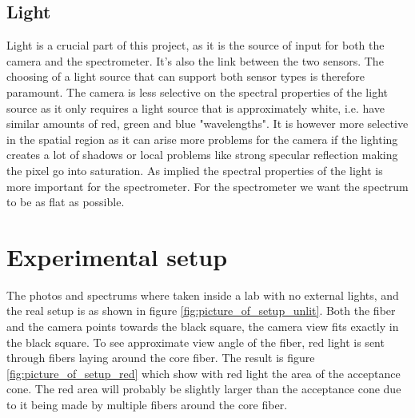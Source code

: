 \subsection{Light}
Light is a crucial part of this project, as it is the source of input for both the camera and the spectrometer. It's also the link between the two sensors. The choosing of a light source that can support both sensor types is therefore paramount. The camera is less selective on the spectral properties of the light source as it only requires a light source that is approximately white, i.e. have similar amounts of red, green and blue "wavelengths". It is however more selective in the spatial region as it can arise more problems for the camera if the lighting creates a lot of shadows or local problems like strong specular reflection making the pixel go into saturation. As implied the spectral properties of the light is more important for the spectrometer. For the spectrometer we want the spectrum to be as flat as possible. 


\section{Experimental setup}
The photos and spectrums where taken inside a lab with no external lights, and the real setup is as shown in figure \ref{fig:picture_of_setup_unlit}. Both the fiber and the camera points towards the black square, the camera view fits exactly in the black square. To see approximate view angle of the fiber, red light is sent through fibers laying around the core fiber. The result is figure \ref{fig:picture_of_setup_red} which show with red light the area of the acceptance cone. The red area will probably be slightly larger than the acceptance cone due to it being made by multiple fibers around the core fiber. 


